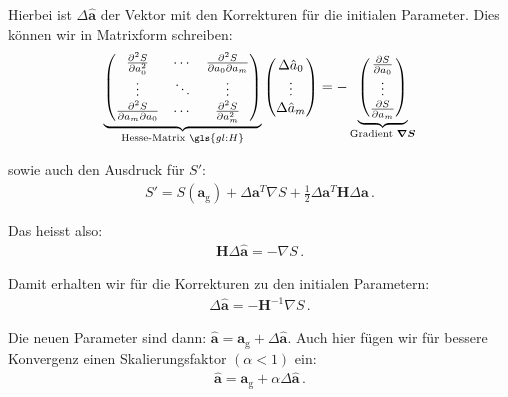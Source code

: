 Hierbei ist $\Delta \boldsymbol{\hat{a}}$ der Vektor mit den Korrekturen f\"ur die initialen Parameter. Dies k\"onnen wir in Matrixform schreiben:
\begin{align}
\underbrace{
\begin{pmatrix}
\frac{\partial^2 S}{\partial a_0^2}            & \cdots & \frac{\partial^2 S}{\partial a_0 \partial a_m} \\
\vdots                                         & \ddots & \vdots                                         \\
\frac{\partial^2 S}{\partial a_m \partial a_0} & \cdots & \frac{\partial^2 S}{\partial a_m^2}            
\end{pmatrix}}_{\text{Hesse-Matrix } \gls{gl:H}}
\begin{pmatrix}
\Delta \hat{a}_0 \\
\vdots           \\
\Delta \hat{a}_m 
\end{pmatrix}
= -
\underbrace{
\begin{pmatrix}
\frac{\partial S}{\partial a_0} \\
\vdots                          \\
\frac{\partial S}{\partial a_m}
\end{pmatrix}}_{\text{Gradient } \boldsymbol{\nabla S}}
\label{eq:vl9-9}
\end{align}

sowie auch den Ausdruck f\"ur $S'$:
\begin{align}
S' = S (\boldsymbol{a}_\mathrm{g}) + \Delta \boldsymbol{a}^T \nabla S + \frac{1}{2} \Delta \boldsymbol{a}^T \boldsymbol{H} \Delta \boldsymbol{a} \,.
\label{eq:vl9-10}
\end{align}

Das heisst also:
\begin{align}
\boldsymbol{H} \Delta \boldsymbol{\hat{a}} = - \nabla S\,.
\label{eq:vl9-11}
\end{align}

Damit erhalten wir f\"ur die Korrekturen zu den initialen Parametern:
\begin{align}
\Delta \boldsymbol{\hat{a}} = -\boldsymbol{H}^{-1} \nabla S\,.
\label{eq:vl9-12}
\end{align}

Die neuen Parameter sind dann: $\boldsymbol{\hat{a}} = \boldsymbol{a}_\mathrm{g} + \Delta \boldsymbol{\hat{a}}$. Auch hier f\"ugen wir f\"ur bessere Konvergenz einen Skalierungsfaktor $(\alpha < 1)$ ein:
\begin{align}
\boldsymbol{\hat{a}} = \boldsymbol{a}_\mathrm{g} + \alpha \Delta \boldsymbol{\hat{a}}\,.
\label{eq:vl9-13}
\end{align}


